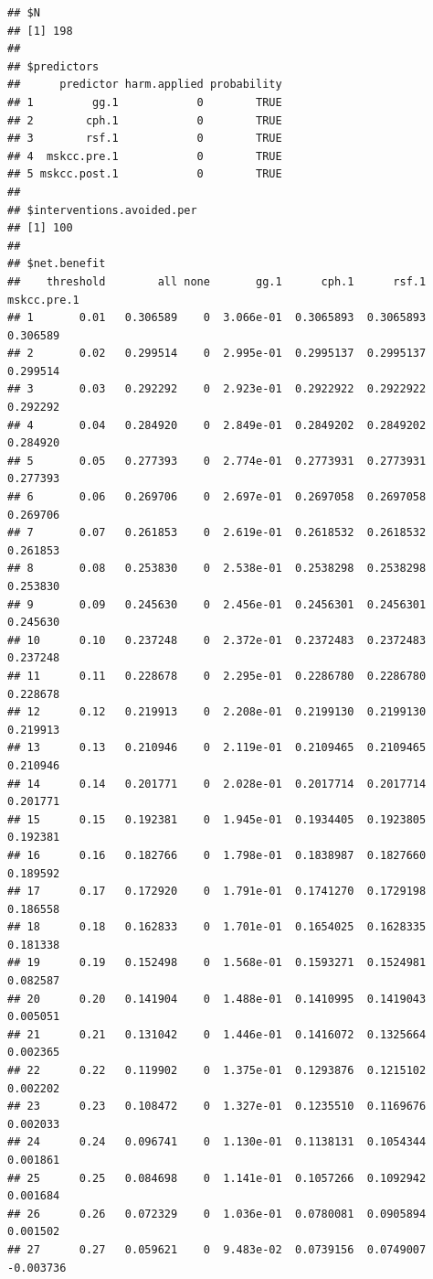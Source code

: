 \documentclass{article}\usepackage[]{graphicx}\usepackage[]{color}
\makeatletter
\newenvironment{kframe}{%
 \def\at@end@of@kframe{}%
 \ifinner\ifhmode%
  \def\at@end@of@kframe{\end{minipage}}%
  \begin{minipage}{\columnwidth}%
 \fi\fi%
 \def\FrameCommand##1{\hskip\@totalleftmargin \hskip-\fboxsep
 \colorbox{shadecolor}{##1}\hskip-\fboxsep
     \hskip-\linewidth \hskip-\@totalleftmargin \hskip\columnwidth}%
 \MakeFramed {\advance\hsize-\width
   \@totalleftmargin\z@ \linewidth\hsize
   \@setminipage}}%
 {\par\unskip\endMakeFramed%
 \at@end@of@kframe}
\newenvironment{knitrout}{}{} %
\makeatother
\begin{document}
\begin{knitrout}
\begin{kframe}\begin{verbatim}
## $N
## [1] 198
## 
## $predictors
##      predictor harm.applied probability
## 1         gg.1            0        TRUE
## 2        cph.1            0        TRUE
## 3        rsf.1            0        TRUE
## 4  mskcc.pre.1            0        TRUE
## 5 mskcc.post.1            0        TRUE
## 
## $interventions.avoided.per
## [1] 100
## 
## $net.benefit
##    threshold        all none       gg.1      cph.1      rsf.1 mskcc.pre.1
## 1       0.01   0.306589    0  3.066e-01  0.3065893  0.3065893    0.306589
## 2       0.02   0.299514    0  2.995e-01  0.2995137  0.2995137    0.299514
## 3       0.03   0.292292    0  2.923e-01  0.2922922  0.2922922    0.292292
## 4       0.04   0.284920    0  2.849e-01  0.2849202  0.2849202    0.284920
## 5       0.05   0.277393    0  2.774e-01  0.2773931  0.2773931    0.277393
## 6       0.06   0.269706    0  2.697e-01  0.2697058  0.2697058    0.269706
## 7       0.07   0.261853    0  2.619e-01  0.2618532  0.2618532    0.261853
## 8       0.08   0.253830    0  2.538e-01  0.2538298  0.2538298    0.253830
## 9       0.09   0.245630    0  2.456e-01  0.2456301  0.2456301    0.245630
## 10      0.10   0.237248    0  2.372e-01  0.2372483  0.2372483    0.237248
## 11      0.11   0.228678    0  2.295e-01  0.2286780  0.2286780    0.228678
## 12      0.12   0.219913    0  2.208e-01  0.2199130  0.2199130    0.219913
## 13      0.13   0.210946    0  2.119e-01  0.2109465  0.2109465    0.210946
## 14      0.14   0.201771    0  2.028e-01  0.2017714  0.2017714    0.201771
## 15      0.15   0.192381    0  1.945e-01  0.1934405  0.1923805    0.192381
## 16      0.16   0.182766    0  1.798e-01  0.1838987  0.1827660    0.189592
## 17      0.17   0.172920    0  1.791e-01  0.1741270  0.1729198    0.186558
## 18      0.18   0.162833    0  1.701e-01  0.1654025  0.1628335    0.181338
## 19      0.19   0.152498    0  1.568e-01  0.1593271  0.1524981    0.082587
## 20      0.20   0.141904    0  1.488e-01  0.1410995  0.1419043    0.005051
## 21      0.21   0.131042    0  1.446e-01  0.1416072  0.1325664    0.002365
## 22      0.22   0.119902    0  1.375e-01  0.1293876  0.1215102    0.002202
## 23      0.23   0.108472    0  1.327e-01  0.1235510  0.1169676    0.002033
## 24      0.24   0.096741    0  1.130e-01  0.1138131  0.1054344    0.001861
## 25      0.25   0.084698    0  1.141e-01  0.1057266  0.1092942    0.001684
## 26      0.26   0.072329    0  1.036e-01  0.0780081  0.0905894    0.001502
## 27      0.27   0.059621    0  9.483e-02  0.0739156  0.0749007   -0.003736

\end{verbatim}
\end{kframe}
\end{knitrout}
\end{document}
